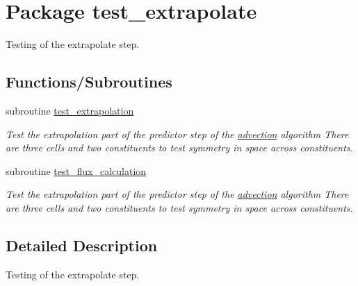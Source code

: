 \hypertarget{a00085}{
\section{Package test\_\-extrapolate}
\label{a00085}
}
Testing of the extrapolate step.  


\subsection*{Functions/Subroutines}
\begin{CompactItemize}
\item 
\hypertarget{a00085_00d7b0df4f9649d6a2e2dbdfc67caaad}{
subroutine \hyperlink{a00085_00d7b0df4f9649d6a2e2dbdfc67caaad}{test\_\-extrapolation}}
\label{a00085_00d7b0df4f9649d6a2e2dbdfc67caaad}

\begin{CompactList}\small\item\em Test the extrapolation part of the predictor step of the \hyperlink{a00052}{advection} algorithm There are three cells and two constituents to test symmetry in space across constituents. \item\end{CompactList}\item 
\hypertarget{a00085_e96d656ee79443b70cfeafb62d802f36}{
subroutine \hyperlink{a00085_e96d656ee79443b70cfeafb62d802f36}{test\_\-flux\_\-calculation}}
\label{a00085_e96d656ee79443b70cfeafb62d802f36}

\begin{CompactList}\small\item\em Test the extrapolation part of the predictor step of the \hyperlink{a00052}{advection} algorithm There are three cells and two constituents to test symmetry in space across constituents. \item\end{CompactList}\end{CompactItemize}


\subsection{Detailed Description}
Testing of the extrapolate step. 

